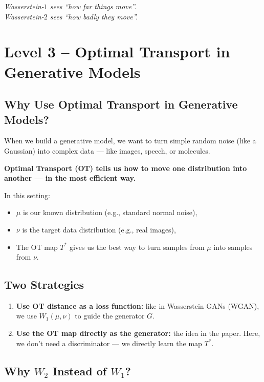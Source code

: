 \documentclass[11pt]{article}
\begin{document}
\begin{center}
\textit{Wasserstein-$1$ sees “how far things move”.\\
Wasserstein-$2$ sees “how badly they move”.}
\end{center}

\newpage
{}
\section*{Level 3 – Optimal Transport in Generative Models}

\subsection*{Why Use Optimal Transport in Generative Models?}

When we build a generative model, we want to turn simple random noise (like a Gaussian) into complex data — like images, speech, or molecules. 

\begin{highlight}
\textbf{Optimal Transport (OT) tells us how to move one distribution into another — in the most efficient way.}
\end{highlight}

In this setting:
\begin{itemize}
  \item $\mu$ is our known distribution (e.g., standard normal noise),
  \item $\nu$ is the target data distribution (e.g., real images),
  \item The OT map $T^*$ gives us the best way to turn samples from $\mu$ into samples from $\nu$.
\end{itemize}

\subsection*{Two Strategies}

\begin{enumerate}
  \item \textbf{Use OT distance as a loss function:} like in Wasserstein GANs (WGAN), we use $W_1(\mu, \nu)$ to guide the generator $G$.
  \item \textbf{Use the OT map directly as the generator:} the idea in the paper. Here, we don’t need a discriminator — we directly learn the map $T^*$.
\end{enumerate}

\subsection*{Why $W_2$ Instead of $W_1$?}
\end{document}
